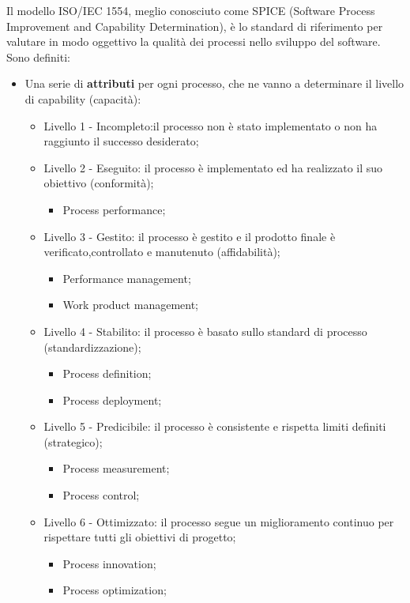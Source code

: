 Il modello ISO/IEC 1554, meglio conosciuto come SPICE (Software Process Improvement and Capability Determination), è lo standard di riferimento per valutare in modo oggettivo la qualità dei processi nello sviluppo del software. \newline
Sono definiti:
\begin{itemize}
	\item Una serie di \textbf{attributi} per ogni processo, che ne vanno a determinare il livello di capability (capacità):
	\begin{itemize}
	\item Livello 1 - Incompleto:il processo non è stato implementato o non ha raggiunto il successo desiderato;
	\item Livello 2 - Eseguito: il processo è implementato ed ha realizzato il suo obiettivo (conformità);
		\begin{itemize}
	    	\item Process performance;
    		\end{itemize}
	\item Livello 3 - Gestito: il processo è gestito e il prodotto finale è verificato,controllato e manutenuto (affidabilità);
		\begin{itemize}	
	    	\item Performance management;
	    	\item Work product management;
		\end{itemize}
    	\item Livello 4 - Stabilito: il processo è basato sullo standard di processo (standardizzazione);
		\begin{itemize}
		\item Process definition;
		\item Process deployment;
		\end{itemize}
    	\item Livello 5 - Predicibile: il processo è consistente e rispetta limiti definiti (strategico);
		\begin{itemize}
		\item Process measurement;
		\item Process control;
		\end{itemize}
    	\item Livello 6 - Ottimizzato: il processo segue un  miglioramento continuo per rispettare tutti gli obiettivi di progetto;
		\begin{itemize}
		\item Process innovation;
		\item Process optimization;
		\end{itemize}
    	\end{itemize}
	

\end{itemize}
